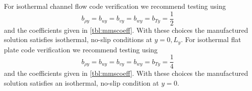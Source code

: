 For isothermal channel flow code verification we recommend testing using
\begin{equation*}
  b_{\rho{}y} =
  b_{u{}y}    =
  b_{v{}y}    =
  b_{w{}y}    =
  b_{T{}y}    = \frac{1}{2}
\end{equation*}
and the coefficients given in \autoref{tbl:mmscoeff}.  With these choices
the manufactured solution satisfies isothermal, no-slip conditions at $y = 0,
L_y$.  For isothermal flat plate code verification we recommend testing using
\begin{equation*}
  b_{\rho{}y} =
  b_{u{}y}    =
  b_{v{}y}    =
  b_{w{}y}    =
  b_{T{}y}    = \frac{1}{4}
\end{equation*}
and the coefficients given in \autoref{tbl:mmscoeff}.  With these choices the
manufactured solution satisfies an isothermal, no-slip condition at $y = 0$.


